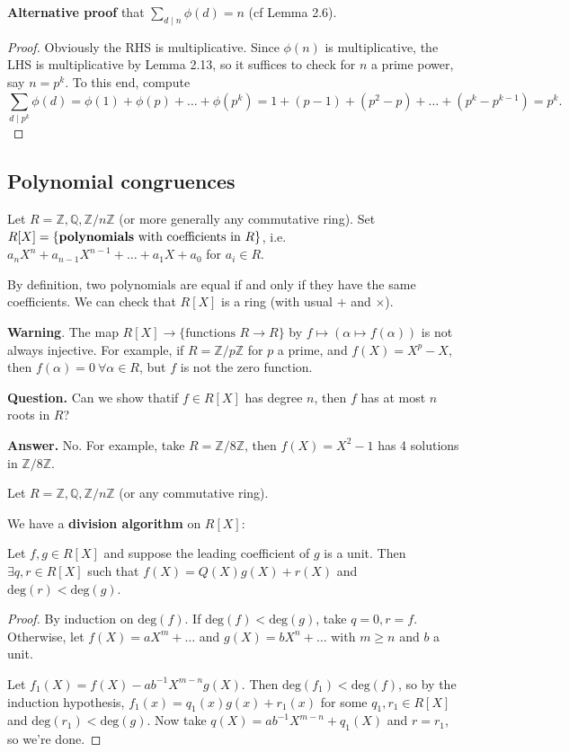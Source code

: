 \documentclass{article}
\theoremstyle{definition}
\theoremstyle{remark}
\begin{document}
\textbf{Alternative proof} that $\sum_{d \mid n}^{} \phi(d) = n$ (cf Lemma 2.6).
\begin{proof}
    Obviously the RHS is multiplicative. Since $\phi(n)$ is multiplicative, the LHS is multiplicative by Lemma 2.13, so it suffices to check for $n$ a prime power, say $n=p^k$. To this end, compute \[
    \sum_{d \mid p^k}^{} \phi(d) = \phi(1) + \phi(p) + \ldots + \phi(p^k) = 1 + (p-1) + (p^2-p) + \ldots + (p^k-p^{k-1}) = p^k.
    \]
\end{proof}

\subsection{Polynomial congruences}
Let $R = \mathbb{Z},\mathbb{Q}, \mathbb{Z}/n\mathbb{Z}$ (or more generally any commutative ring). Set $R[X] = \{\text{\textbf{polynomials} with coefficients in }R\}$, i.e. $a_n X^n + a_{n-1}X^{n-1} + \ldots + a_1 X + a_0$ for $a_i \in R$.

By definition, two polynomials are equal if and only if they have the same coefficients. We can check that $R[X]$ is a ring (with usual $+$ and $\times$).
\vspace{1mm}

\textbf{Warning}. The map $R[X] \to \{\text{functions }R \to R\}$ by $f \mapsto (\alpha \mapsto f(\alpha))$ is not always injective. For example, if $R=\mathbb{Z}/p\mathbb{Z}$ for $p$ a prime, and $f(X)=X^p - X$, then $f(\alpha)=0 ~\forall \alpha \in R$, but $f$ is not the zero function.
\vspace{1mm}

\textbf{Question.} Can we show thatif $f \in R[X]$ has degree $n$, then $f$ has at most $n$ roots in $R$?
\vspace{1mm}

\textbf{Answer.} No. For example, take $R = \mathbb{Z}/8\mathbb{Z}$, then $f(X)=X^2-1$ has 4 solutions in $\mathbb{Z}/8\mathbb{Z}$.

\vspace{1mm}

Let $R=\mathbb{Z},\mathbb{Q}, \mathbb{Z}/n\mathbb{Z}$ (or any commutative ring).

We have a \textbf{division algorithm} on $R[X]$: 

Let $f,g \in R[X]$ and suppose the leading coefficient of $g$ is a unit. Then $\exists q, r \in R[X]$ such that $f(X)=Q(X)g(X)+r(X)$ and $\text{deg}(r)<\text{deg}(g)$.

\begin{proof}
    By induction on $\text{deg}(f)$. If $\text{deg}(f) < \text{deg}(g)$, take $q=0, r=f$. Otherwise, let $f(X) = a X^m + \ldots$ and $g(X) = b X^n + \ldots$ with $m \ge n$ and $b$ a unit.
    \vspace{1mm}
    
    Let $f_1(X) = f(X)- ab^{-1}X^{m-n}g(X)$. Then $\text{deg}(f_1) < \text{deg}(f)$, so by the induction hypothesis, $f_1(x)=q_1(x)g(x) + r_1(x)$ for some $q_1,r_1 \in R[X]$ and $\text{deg}(r_1) < \text{deg}(g)$. Now take $q(X) = ab^{-1}X^{m-n} + q_1(X)$ and $r=r_1$, so we're done.
\end{proof}
\end{document}
